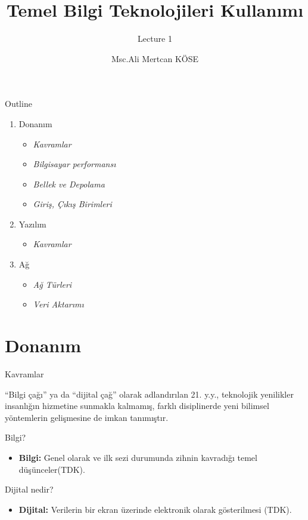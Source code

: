 \documentclass[
  12pt,
  ignorenonframetext,
]{beamer}
\title{Temel Bilgi Teknolojileri Kullanımı}
\subtitle{Lecture 1}
\author{Msc.Ali Mertcan KÖSE}
\date{}
\institute{İstanbul Kent Üniversitesi}
\providecommand{\tightlist}{%
  \setlength{\itemsep}{0pt}\setlength{\parskip}{0pt}}
\begin{document}
\frame{\titlepage}

\begin{frame}

\begin{block}{Outline}

\begin{enumerate}
\item
  Donanım

  \begin{itemize}
  \tightlist
  \item
    \emph{Kavramlar}
  \item
    \emph{Bilgisayar performansı}
  \item
    \emph{Bellek ve Depolama}
  \item
    \emph{Giriş, Çıkış Birimleri}
  \end{itemize}
\item
  Yazılım

  \begin{itemize}
  \tightlist
  \item
    \emph{Kavramlar}
  \end{itemize}
\item
  Ağ

  \begin{itemize}
  \tightlist
  \item
    \emph{Ağ Türleri}
  \item
    \emph{Veri Aktarımı}
  \end{itemize}
\end{enumerate}

\end{block}

\end{frame}

\hypertarget{donanux131m}{%
\section{Donanım}\label{donanux131m}}

\begin{frame}{Kavramlar}
\protect\hypertarget{kavramlar}{}

\justify

``Bilgi çağı'' ya da ``dijital çağ'' olarak adlandırılan 21. y.y.,
teknolojik yenilikler insanlığın hizmetine sunmakla kalmamış, farklı
disiplinerde yeni bilimsel yöntemlerin gelişmesine de imkan tanımıştır.

Bilgi?

\begin{itemize}
\tightlist
\item
  \textbf{Bilgi:} Genel olarak ve ilk sezi durumunda zihnin kavradığı
  temel düşünceler(TDK).
\end{itemize}

Dijital nedir?

\begin{itemize}
\tightlist
\item
  \textbf{Dijital:} Verilerin bir ekran üzerinde elektronik olarak
  gösterilmesi (TDK).
\end{itemize}

\end{frame}
\end{document}
